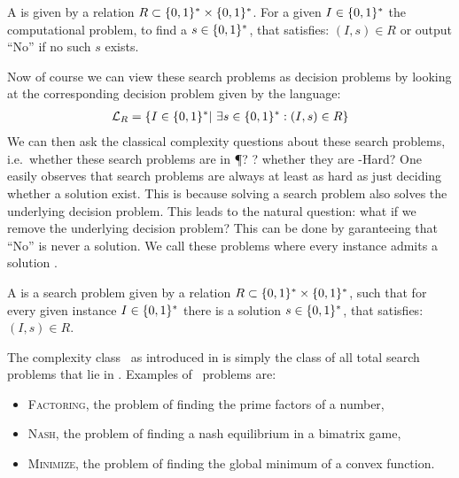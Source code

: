 \begin{definition}
    A  is given by a relation $R\subset \{0, 1\}^* \times \{0, 1\}^*$.
    For a given  $I\in \{0, 1\}^*$ the computational problem, to find a  $s \in \{0, 1\}^*$, that satisfies:
    $(I, s) \in R$ or output ``No'' if no such $s$ exists.
\end{definition}
Now of course we can view these search problems as decision problems by looking at the corresponding decision problem given by the language:
\begin{align*}
    \mathcal{L}_R = \{ I \in \{0, 1\}^* |\ \exists s \in \{0, 1\}^* : (I, s) \in R\}
\end{align*}
We can then ask the classical complexity questions about these search problems, i.e.~whether these search problems are in \P{}? \NP{}? whether they are
\NP-Hard?
One easily observes that search problems are always at least as hard as just deciding whether a solution exist.
This is because solving a search problem also solves the underlying decision problem.
This leads to the natural question: what if we remove the underlying decision problem?
This can be done by garanteeing that ``No'' is never a solution.
We call these problems where every instance admits a solution .
\begin{definition}
    A  is a search problem given by a relation $R\subset \{0, 1\}^* \times \{0, 1\}^*$, such that for every given instance $I\in
        \{0, 1\}^*$ there is a solution $s \in \{0, 1\}^*$, that satisfies: $(I, s) \in R$.
\end{definition}
The complexity class \TFNP\ as introduced in  is simply the class of all total search problems that lie in \NP{}.
Examples of \TFNP\ problems are:
\begin{itemize}
    \item \textsc{Factoring}, the problem of finding the prime factors of a number,
    \item \textsc{Nash}, the problem of finding a nash equilibrium in a bimatrix game,
    \item \textsc{Minimize}, the problem of finding the global minimum of a convex function.
\end{itemize}
